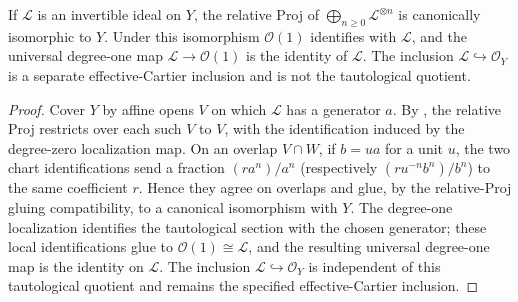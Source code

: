 \begin{lemma}
  \label{lemma:nagata-relative-proj-invertible-tensor-powers}

  If $\mathcal L$ is an invertible ideal on $Y$, the relative Proj of
  $\bigoplus_{n\geq0}\mathcal L^{\otimes n}$ is canonically isomorphic to $Y$.
  Under this isomorphism $\mathcal O(1)$ identifies with $\mathcal L$, and
  the universal degree-one map $\mathcal L\to\mathcal O(1)$ is the identity
  of $\mathcal L$.  The inclusion
  $\mathcal L\hookrightarrow\mathcal O_Y$ is a separate effective-Cartier
  inclusion and is not the tautological quotient.
\end{lemma}

\begin{proof}
  Cover $Y$ by affine opens $V$ on which $\mathcal L$ has a generator $a$.
  By , the
  relative Proj restricts over each such $V$ to $V$, with the identification
  induced by the degree-zero localization map.  On an overlap $V\cap W$, if
  $b=ua$ for a unit $u$, the two chart identifications send a fraction
  $(r a^n)/a^n$ (respectively $(r u^{-n}b^n)/b^n$) to the same coefficient $r$.
  Hence they agree on overlaps and glue, by the relative-Proj gluing
  compatibility, to a canonical isomorphism with $Y$.  The degree-one
  localization identifies the tautological section with the chosen generator;
  these local identifications glue to $\mathcal O(1)\cong\mathcal L$, and the
  resulting universal degree-one map is the identity on $\mathcal L$.  The
  inclusion $\mathcal L\hookrightarrow\mathcal O_Y$ is independent of this
  tautological quotient and remains the specified effective-Cartier inclusion.
\end{proof}

